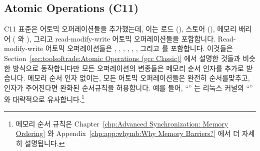 \subsection{Atomic Operations (C11)}
\label{sec:toolsoftrade:Atomic Operations (C11)}

C11 표준은 어토믹 오퍼레이션들을 추가했는데, 이는 로드 (),
스토어 (), 메모리 배리어 ( 와
), 그리고 read-modify-write 어토믹 오퍼레이션들을
포함합니다.
Read-modify-write 어토믹 오퍼레이션들은
,
,
,
,
,
,
그리고
 를 포함합니다.
이것들은
Section~\ref{sec:toolsoftrade:Atomic Operations (gcc Classic)} 에서 설명한
것들과 비슷한 방식으로 동작합니다만 모든 오퍼레이션의  변종들은
메모리 순서 인자를 추가로 받습니다.
메모리 순서 인자 없이는, 모든 어토믹 오퍼레이션들은 완전히 순서를맞추고, 인자가
주어진다면 완화된 순서규칙을 허용합니다.
예를 들어, ``'' 는 리눅스
커널의 ``'' 와 대략적으로 유사합니다.\footnote{
	메모리 순서 규칙은
	Chapter~\ref{chp:Advanced Synchronization: Memory Ordering} 와
	Appendix~\ref{chp:app:whymb:Why Memory Barriers?}
	에서 더 자세히 설명됩니다.}

